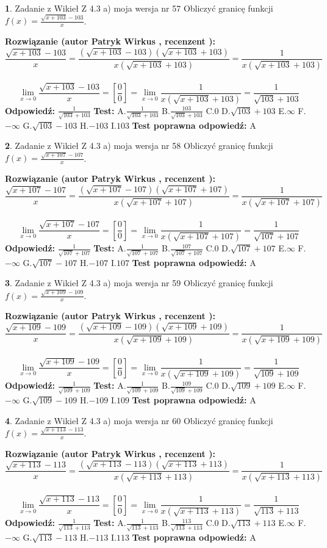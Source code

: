 \documentclass[12pt, a4paper]{article}
\theoremstyle{definition} %
\newtheorem{zad}{}
\newcommand{\zadStart}[1]{\begin{zad}#1\newline}
\newcommand{\zadStop}{\end{zad}}
\newcommand{\rozwStart}[2]{\noindent \textbf{Rozwiązanie (autor #1 , recenzent #2): }\newline}
\newcommand{\rozwStop}{\newline}
\newcommand{\odpStart}{\noindent \textbf{Odpowiedź:}\newline}
\newcommand{\odpStop}{\newline}
\newcommand{\testStart}{\noindent \textbf{Test:}\newline}
\newcommand{\testStop}{\newline}
\newcommand{\kluczStart}{\noindent \textbf{Test poprawna odpowiedź:}\newline}
\newcommand{\kluczStop}{\newline}
\begin{document}
\zadStart{Zadanie z Wikieł Z 4.3 a) moja wersja nr 57}
Obliczyć granicę funkcji $f(x)=\frac{\sqrt{x+103}-103}{x}$.
\zadStop
\rozwStart{Patryk Wirkus}{}
$$\frac{\sqrt{x+103}-103}{x}=\frac{(\sqrt{x+103}-103)(\sqrt{x+103}+103)}{x(\sqrt{x+103}+103)}=\frac{1}{x(\sqrt{x+103}+103)}$$
\\
$$\lim\limits_{x\to0}\frac{\sqrt{x+103}-103}{x}=[\frac{0}{0}]=
\lim\limits_{x\to0}\frac{1}{x(\sqrt{x+103}+103)} = \frac{1}{\sqrt{103}+103}$$
\rozwStop
\odpStart
$\frac{1}{\sqrt{103}+103}$
\odpStop
\testStart
A.$\frac{1}{\sqrt{103}+103}$
B.$\frac{103}{\sqrt{103}+103}$
C.$0$
D.$\sqrt{103}+103$
E.$\infty$
F.$-\infty$
G.$\sqrt{103}-103$
H.$-103$
I.$103$
\testStop
\kluczStart
A
\kluczStop



\zadStart{Zadanie z Wikieł Z 4.3 a) moja wersja nr 58}
Obliczyć granicę funkcji $f(x)=\frac{\sqrt{x+107}-107}{x}$.
\zadStop
\rozwStart{Patryk Wirkus}{}
$$\frac{\sqrt{x+107}-107}{x}=\frac{(\sqrt{x+107}-107)(\sqrt{x+107}+107)}{x(\sqrt{x+107}+107)}=\frac{1}{x(\sqrt{x+107}+107)}$$
\\
$$\lim\limits_{x\to0}\frac{\sqrt{x+107}-107}{x}=[\frac{0}{0}]=
\lim\limits_{x\to0}\frac{1}{x(\sqrt{x+107}+107)} = \frac{1}{\sqrt{107}+107}$$
\rozwStop
\odpStart
$\frac{1}{\sqrt{107}+107}$
\odpStop
\testStart
A.$\frac{1}{\sqrt{107}+107}$
B.$\frac{107}{\sqrt{107}+107}$
C.$0$
D.$\sqrt{107}+107$
E.$\infty$
F.$-\infty$
G.$\sqrt{107}-107$
H.$-107$
I.$107$
\testStop
\kluczStart
A
\kluczStop



\zadStart{Zadanie z Wikieł Z 4.3 a) moja wersja nr 59}
Obliczyć granicę funkcji $f(x)=\frac{\sqrt{x+109}-109}{x}$.
\zadStop
\rozwStart{Patryk Wirkus}{}
$$\frac{\sqrt{x+109}-109}{x}=\frac{(\sqrt{x+109}-109)(\sqrt{x+109}+109)}{x(\sqrt{x+109}+109)}=\frac{1}{x(\sqrt{x+109}+109)}$$
\\
$$\lim\limits_{x\to0}\frac{\sqrt{x+109}-109}{x}=[\frac{0}{0}]=
\lim\limits_{x\to0}\frac{1}{x(\sqrt{x+109}+109)} = \frac{1}{\sqrt{109}+109}$$
\rozwStop
\odpStart
$\frac{1}{\sqrt{109}+109}$
\odpStop
\testStart
A.$\frac{1}{\sqrt{109}+109}$
B.$\frac{109}{\sqrt{109}+109}$
C.$0$
D.$\sqrt{109}+109$
E.$\infty$
F.$-\infty$
G.$\sqrt{109}-109$
H.$-109$
I.$109$
\testStop
\kluczStart
A
\kluczStop



\zadStart{Zadanie z Wikieł Z 4.3 a) moja wersja nr 60}
Obliczyć granicę funkcji $f(x)=\frac{\sqrt{x+113}-113}{x}$.
\zadStop
\rozwStart{Patryk Wirkus}{}
$$\frac{\sqrt{x+113}-113}{x}=\frac{(\sqrt{x+113}-113)(\sqrt{x+113}+113)}{x(\sqrt{x+113}+113)}=\frac{1}{x(\sqrt{x+113}+113)}$$
\\
$$\lim\limits_{x\to0}\frac{\sqrt{x+113}-113}{x}=[\frac{0}{0}]=
\lim\limits_{x\to0}\frac{1}{x(\sqrt{x+113}+113)} = \frac{1}{\sqrt{113}+113}$$
\rozwStop
\odpStart
$\frac{1}{\sqrt{113}+113}$
\odpStop
\testStart
A.$\frac{1}{\sqrt{113}+113}$
B.$\frac{113}{\sqrt{113}+113}$
C.$0$
D.$\sqrt{113}+113$
E.$\infty$
F.$-\infty$
G.$\sqrt{113}-113$
H.$-113$
I.$113$
\testStop
\kluczStart
A
\kluczStop
\end{document}
